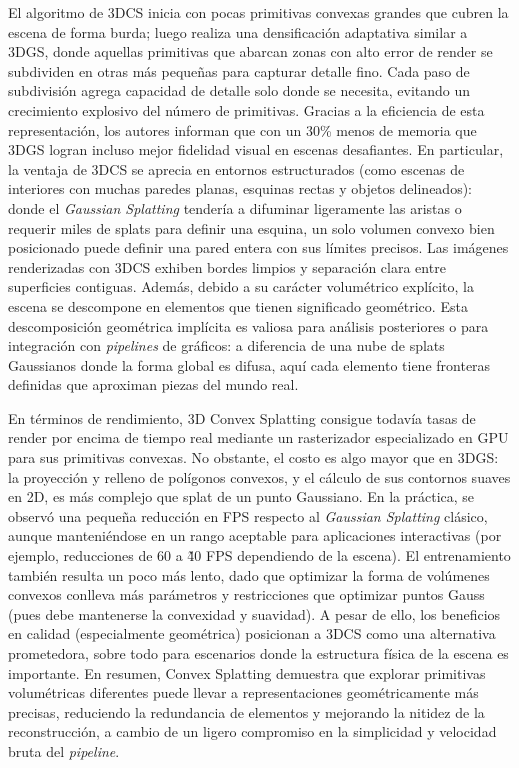 El algoritmo de 3DCS inicia con pocas primitivas convexas grandes que cubren la escena de forma burda; luego realiza una densificación adaptativa similar a 3DGS, donde aquellas primitivas que abarcan zonas con alto error de render se subdividen en otras más pequeñas para capturar detalle fino. Cada paso de subdivisión agrega capacidad de detalle solo donde se necesita, evitando un crecimiento explosivo del número de primitivas. Gracias a la eficiencia de esta representación, los autores informan que con un 30\% menos de memoria que 3DGS logran incluso mejor fidelidad visual en escenas desafiantes. En particular, la ventaja de 3DCS se aprecia en entornos estructurados (como escenas de interiores con muchas paredes planas, esquinas rectas y objetos delineados): donde el \textit{Gaussian Splatting} tendería a difuminar ligeramente las aristas o requerir miles de splats para definir una esquina, un solo volumen convexo bien posicionado puede definir una pared entera con sus límites precisos. Las imágenes renderizadas con 3DCS exhiben bordes limpios y separación clara entre superficies contiguas. Además, debido a su carácter volumétrico explícito, la escena se descompone en elementos que tienen significado geométrico. Esta descomposición geométrica implícita es valiosa para análisis posteriores o para integración con \textit{pipelines} de gráficos: a diferencia de una nube de splats Gaussianos donde la forma global es difusa, aquí cada elemento tiene fronteras definidas que aproximan piezas del mundo real.

En términos de rendimiento, 3D Convex Splatting consigue todavía tasas de render por encima de tiempo real mediante un rasterizador especializado en GPU para sus primitivas convexas. No obstante, el costo es algo mayor que en 3DGS: la proyección y relleno de polígonos convexos, y el cálculo de sus contornos suaves en 2D, es más complejo que splat de un punto Gaussiano. En la práctica, se observó una pequeña reducción en FPS respecto al \textit{Gaussian Splatting} clásico, aunque manteniéndose en un rango aceptable para aplicaciones interactivas (por ejemplo, reducciones de 60 a \~40 FPS dependiendo de la escena). El entrenamiento también resulta un poco más lento, dado que optimizar la forma de volúmenes convexos conlleva más parámetros y restricciones que optimizar puntos Gauss (pues debe mantenerse la convexidad y suavidad). A pesar de ello, los beneficios en calidad (especialmente geométrica) posicionan a 3DCS como una alternativa prometedora, sobre todo para escenarios donde la estructura física de la escena es importante. En resumen, Convex Splatting demuestra que explorar primitivas volumétricas diferentes puede llevar a representaciones geométricamente más precisas, reduciendo la redundancia de elementos y mejorando la nitidez de la reconstrucción, a cambio de un ligero compromiso en la simplicidad y velocidad bruta del \textit{pipeline}.

